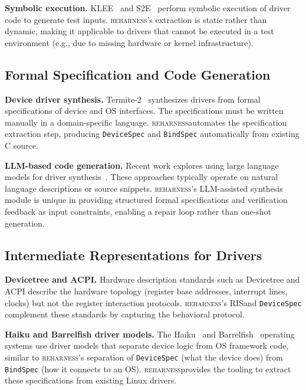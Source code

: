 \documentclass[sigplan, screen, review, anonymous]{acmart}
\newcommand{\reharness}{\textsc{reharness}}
\newcommand{\rislang}{RIS}
\begin{document}
\textbf{Symbolic execution.} KLEE~\cite{cadar2008klee} and S2E~\cite{chipounov2011s2e} perform symbolic execution of driver code to generate test inputs. \reharness's extraction is static rather than dynamic, making it applicable to drivers that cannot be executed in a test environment (e.g., due to missing hardware or kernel infrastructure).

\subsection{Formal Specification and Code Generation}

\textbf{Device driver synthesis.} Termite-2~\cite{ryzhyk2014termite2} synthesizes drivers from formal specifications of device and OS interfaces. The specifications must be written manually in a domain-specific language. \reharness automates the specification extraction step, producing \texttt{DeviceSpec} and \texttt{BindSpec} automatically from existing C source.

\textbf{LLM-based code generation.} Recent work explores using large language models for driver synthesis~\cite{roelofs2023large}. These approaches typically operate on natural language descriptions or source snippets. \reharness's LLM-assisted synthesis module is unique in providing structured formal specifications and verification feedback as input constraints, enabling a repair loop rather than one-shot generation.

\subsection{Intermediate Representations for Drivers}

\textbf{Devicetree and ACPI.} Hardware description standards such as Devicetree and ACPI describe the hardware topology (register base addresses, interrupt lines, clocks) but not the register interaction protocols. \reharness's \rislang and \texttt{DeviceSpec} complement these standards by capturing the behavioral protocol.

\textbf{Haiku and Barrelfish driver models.} The Haiku~\cite{haiku} and Barrelfish~\cite{baumann2009multikernel} operating systems use driver models that separate device logic from OS framework code, similar to \reharness's separation of \texttt{DeviceSpec} (what the device does) from \texttt{BindSpec} (how it connects to an OS). \reharness provides the tooling to extract these specifications from existing Linux drivers.
\end{document}
